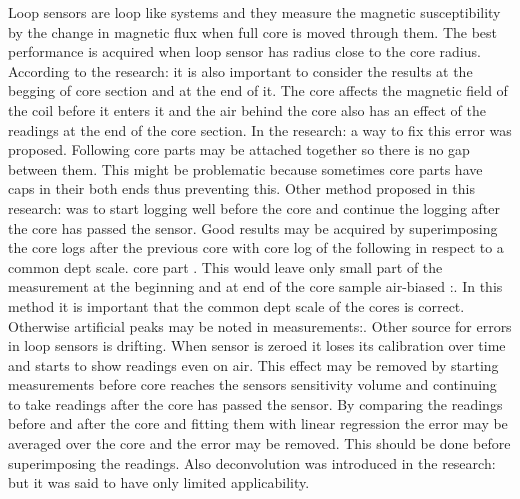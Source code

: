 \documentclass[12pt,a4paper,oneside,pdftex]{report}
\begin{document}

Loop sensors are loop like systems and they measure the magnetic susceptibility by the change in magnetic flux when full core is moved through them. 
The best performance is acquired when loop sensor has radius close to the core radius. According to the 
research\cite{Nowaczyk2001}: it is also important to consider the results at the begging of core section and at the
end of it. The core affects the magnetic field of the coil before it enters it and the air behind the core also has 
an effect of the readings at the end of the core section. In the research\cite{Nowaczyk2001}: a way to fix this 
error was proposed. Following core parts may be attached together so there is no gap between them. This might be
problematic because sometimes core parts have caps in their both ends thus preventing this. Other method proposed
in this research\cite{Nowaczyk2001}: was to start logging well before the core and continue the logging after the
core has passed the sensor. Good results may be acquired by superimposing the core logs after the previous core with
core log of the following in respect to a common dept scale.
core part . This would leave only small part of the measurement at the beginning and at
end of the core sample air-biased \cite{Nowaczyk2001}:. In this method it is important that the common dept scale
of the cores is correct. Otherwise artificial peaks may be noted in measurements\cite{Nowaczyk2001}:. Other source
for errors in loop sensors is drifting. When sensor is zeroed it loses its calibration over time and starts to 
show readings even on air. This effect may be removed by starting measurements before core reaches the sensors
sensitivity volume and continuing to take readings after the core has passed the sensor. By comparing the readings
before and after the core and fitting them with linear regression the error may be averaged over the core and the 
error may be removed. This should be done before superimposing the readings. Also deconvolution was introduced in
the research\cite{Nowaczyk2001}: but it was said to have only limited applicability.
\end{document}
